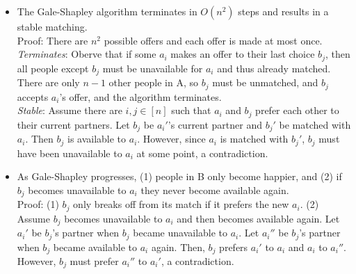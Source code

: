 \documentclass{article}
\begin{document}
\begin{itemize}
    \item The Gale-Shapley algorithm terminates in $O(n^2)$ steps and results in a stable matching. \\[0.5ex]
    Proof: There are $n^2$ possible offers and each offer is made at most once. \\[0.35ex]
    \textit{Terminates}: Oberve that if some $a_i$ makes an offer to their last choice $b_j$, then all people except $b_j$ must be unavailable for $a_i$ and thus already matched. There are only $n - 1$ other people in A, so $b_j$ must be unmatched, and $b_j$ accepts $a_i$'s offer, and the algorithm terminates. \\[0.55ex] 
    \textit{Stable}: Assume there are $i,j \in [n]$ such that $a_i$ and $b_j$ prefer each other to their current partners. Let $b_j$ be $a_i'$'s current partner and $b_j'$ be matched with $a_i$. Then $b_j$ is available to $a_i$. However, since $a_i$ is matched with $b_j'$, $b_j$ must have been unavailable to $a_i$ at some point, a contradiction.
    \item As Gale-Shapley progresses, (1) people in B only become happier, and (2) if $b_j$ becomes unavailable to $a_i$ they never become available again. \\[0.5ex]
    Proof: (1) $b_j$ only breaks off from its match if it prefers the new $a_i$.
    (2) Assume $b_j$ becomes unavailable to $a_i$ and then becomes available again. Let $a_i'$ be $b_j$'s partner when $b_j$ became unavailable to $a_i$. Let $a_i''$ be $b_j$'s partner when $b_j$ became available to $a_i$ again. Then, $b_j$ prefers $a_i'$ to $a_i$ and $a_i$ to $a_i''$. However, $b_j$ must prefer $a_i''$ to $a_i'$, a contradiction. 
\end{itemize}
\end{document}
